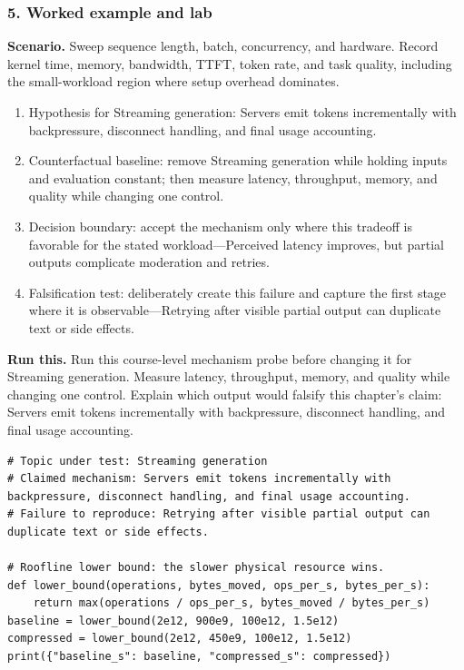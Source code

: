 \subsubsection*{5. Worked example and lab}
\textbf{Scenario.} Sweep sequence length, batch, concurrency, and hardware. Record kernel time, memory, bandwidth, TTFT, token rate, and task quality, including the small-workload region where setup overhead dominates.
\begin{enumerate}
\item Hypothesis for Streaming generation: Servers emit tokens incrementally with backpressure, disconnect handling, and final usage accounting.
\item Counterfactual baseline: remove Streaming generation while holding inputs and evaluation constant; then measure latency, throughput, memory, and quality while changing one control.
\item Decision boundary: accept the mechanism only where this tradeoff is favorable for the stated workload—Perceived latency improves, but partial outputs complicate moderation and retries.
\item Falsification test: deliberately create this failure and capture the first stage where it is observable—Retrying after visible partial output can duplicate text or side effects.
\end{enumerate}
\textbf{Run this.} Run this course-level mechanism probe before changing it for Streaming generation. Measure latency, throughput, memory, and quality while changing one control. Explain which output would falsify this chapter's claim: Servers emit tokens incrementally with backpressure, disconnect handling, and final usage accounting.
\begin{Verbatim}[fontsize=\scriptsize]
# Topic under test: Streaming generation
# Claimed mechanism: Servers emit tokens incrementally with backpressure, disconnect handling, and final usage accounting.
# Failure to reproduce: Retrying after visible partial output can duplicate text or side effects.

# Roofline lower bound: the slower physical resource wins.
def lower_bound(operations, bytes_moved, ops_per_s, bytes_per_s):
    return max(operations / ops_per_s, bytes_moved / bytes_per_s)
baseline = lower_bound(2e12, 900e9, 100e12, 1.5e12)
compressed = lower_bound(2e12, 450e9, 100e12, 1.5e12)
print({"baseline_s": baseline, "compressed_s": compressed})
\end{Verbatim}
